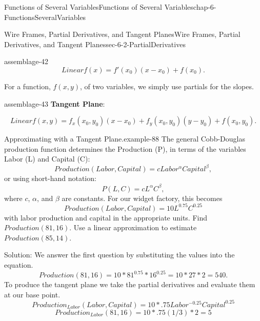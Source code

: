 \documentclass[oneside,10pt,]{book}
\newcommand{\terminology}[1]{\textbf{#1}}
\numberwithin{equation}{section}
\begin{document}
\begin{chapterptx}{Functions of Several Variables}{}{Functions of Several Variables}{}{}{chap-6-FunctionsSeveralVariables}
\begin{sectionptx}{Wire Frames, Partial Derivatives, and Tangent Planes}{}{Wire Frames, Partial Derivatives, and Tangent Planes}{}{}{sec-6-2-PartialDerivatives}
\begin{assemblage}{}{assemblage-42}
\begin{equation*}
Linear f(x)=f' (x_0 )(x-x_0 )+f(x_0 ).
\end{equation*}
%
\end{assemblage}
\hypertarget{p-2228}{}%
For a function, \(f(x,y)\), of two variables, we simply use partials for the slopes.%
\begin{assemblage}{}{assemblage-43}%
\hypertarget{p-2229}{}%
\terminology{Tangent Plane}:%
\par
\hypertarget{p-2230}{}%
%
\begin{equation*}
Linear f(x ,y)=f_x (x_0,y_0 )(x-x_0 )+f_y (x_0,y_0 )(y-y_0)+f(x_0,y_0 ).
\end{equation*}
%
\end{assemblage}
\begin{example}{Approximating with a Tangent Plane.}{example-88}%
\hypertarget{p-2231}{}%
The general Cobb-Douglas production function determines the Production (P), in terms of the variables Labor (L) and Capital (C):%
%
\begin{equation*}
Production(Labor,Capital)=c Labor^{\alpha}  Capital^{\beta},
\end{equation*}
\hypertarget{p-2232}{}%
or using short-hand notation:%
%
\begin{equation*}
P(L,C)=c L^{\alpha}  C^\beta,
\end{equation*}
\hypertarget{p-2233}{}%
where \(c\), \(\alpha\), and \(\beta\) are constants.  For our widget factory, this becomes%
%
\begin{equation*}
Production(Labor,Capital)=10 L^{0.75}  C^{0.25}
\end{equation*}
\hypertarget{p-2234}{}%
with labor production and capital in the appropriate units.  Find \(Production(81,16)\).  Use a linear approximation to estimate \(Production(85,14)\).%
\par
\hypertarget{p-2235}{}%
Solution:  We answer the first question by substituting the values into the equation.%
%
\begin{equation*}
Production(81,16)=10*81^{0.75}*16^{0.25}=10*27*2=540.
\end{equation*}
\hypertarget{p-2236}{}%
To produce the tangent plane we take the partial derivatives and evaluate them at our base point.%
%
\begin{equation*}
Production_{Labor} (Labor,Capital)=10*.75 Labor^{-0.25}  Capital^{0.25}
\end{equation*}
%
\begin{equation*}
Production_{Labor} (81,16)=10*.75 (1/3) *2=5
\end{equation*}

\end{example}
\end{sectionptx}
\end{chapterptx}
\end{document}
